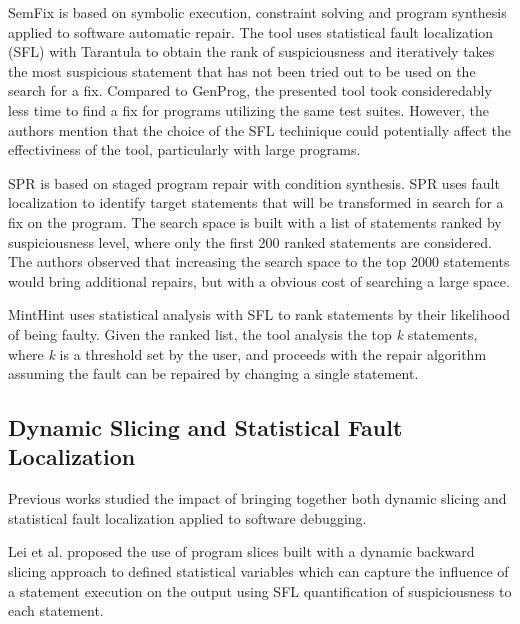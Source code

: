 \documentclass[sigplan,10pt,review,anonymous]{acmart}\settopmatter{printfolios=true,printccs=false,printacmref=false}
\begin{document}
SemFix is based on symbolic execution, constraint solving and program synthesis applied to software automatic repair. The tool uses statistical fault localization (SFL) with Tarantula to
obtain the rank of suspiciousness and iteratively takes the most suspicious statement that has not been tried out to be used on the search for a fix. Compared to GenProg, the presented tool
took consideredably less time to find a fix for programs utilizing the same test suites. However, the authors mention that the choice of the SFL techinique could potentially affect the
effectiviness of the tool, particularly with large programs.

SPR  is based on staged
program repair with condition synthesis. SPR uses fault localization
to identify target statements that will be transformed in search for a
fix on the program. The search space is built with a list of
statements ranked by suspiciousness level, where only the first 200
ranked statements are considered. The authors observed that increasing
the search space to the top 2000 statements would bring additional
repairs, but with a obvious cost of searching a large space.

MintHint  uses statistical analysis with SFL to rank
statements by their likelihood of being faulty. Given the ranked list,
the tool analysis the top \textit{k} statements, where \textit{k} is a
threshold set by the user, and proceeds with the repair algorithm
assuming the fault can be repaired by changing a single statement.



\subsection{Dynamic Slicing and Statistical Fault Localization}

Previous works studied the impact of bringing together both dynamic
slicing and statistical fault localization applied to software
debugging.

Lei et al. proposed the use of program slices built with a
dynamic backward slicing approach to defined statistical variables
which can capture the influence of a statement execution on the output
using SFL quantification of suspiciousness to each statement\cite{lei-mao-dai-wang-2012}.
\end{document}
